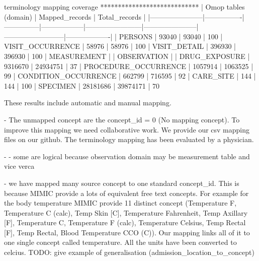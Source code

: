 terminology mapping coverage
****************************
| Omop tables (domain)  | Mapped_records | Total_records | %
|-----------------------|----------------|---------------|------------------|------------------------|-----------------------|--------------------------|-------------------|
| PERSONS               | 93040          |         93040 |            100 %
| VISIT_OCCURRENCE 	| 58976          |         58976 |            100 %
| VISIT_DETAIL 		| 396930         |        396930 |            100 %
| MEASUREMENT 		| 
| OBSERVATION 		| 
| DRUG_EXPOSURE 	| 9316670        |      24934751 |             37 %
| PROCEDURE_OCCURRENCE  | 1057914        |       1063525 |             99 %
| CONDITION_OCCURRENCE 	| 662799         |        716595 |             92 %
| CARE_SITE 		| 144            |           144 |            100 %
| SPECIMEN 	 	| 28181686       |      39874171 |             70 %

These results include automatic and manual mapping.

- The unmapped concept are the concept_id = 0 (No mapping concept). To improve this mapping we need collaborative work. We provide our csv mapping files on our github.
The terminology mapping has been evaluated by a physician. 

- %
	- some are logical because observation domain may be measurement table and vice verca

- we have mapped  many source concept to one standard concept_id. This is because MIMIC provide a lots of equivalent free text concepts.
  For example for the body temperature MIMIC provide 11 distinct concept (Temperature F, Temperature C (calc), Temp Skin [C], Temperature Fahrenheit, Temp Axillary [F], Temperature C, Temperature F (calc), Temperature Celsius, Temp Rectal [F], Temp Rectal, Blood Temperature CCO (C)). Our mapping links all of it to one single concept called temperature. All the units have been converted to celcius.
  TODO: give example of generalisation (admission_location_to_concept)

